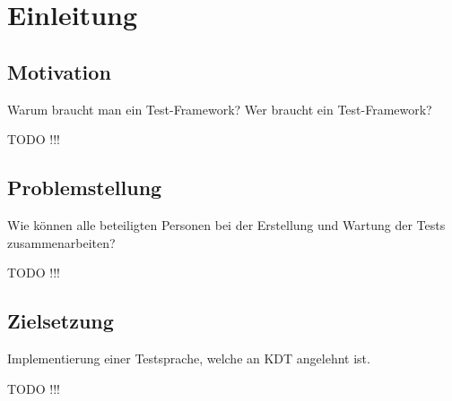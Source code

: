 \chapter{Einleitung}
\label{cha:Einleitung}

\section{Motivation}

Warum braucht man ein Test-Framework?
Wer braucht ein Test-Framework?

TODO !!!

\section{Problemstellung}

Wie können alle beteiligten Personen bei der Erstellung und Wartung der Tests zusammenarbeiten?

TODO !!!

\section{Zielsetzung}

Implementierung einer Testsprache, welche an KDT angelehnt ist.

TODO !!!

